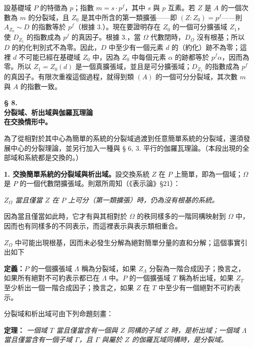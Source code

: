 \documentclass[11pt]{article}
\providecommand{\srcspaced}[1]{#1}
\begin{document}
設基礎域 \(P\) 的特徵為 \(p\)；指數 \(m=s\cdot p^f\)，其中 \(s\) 與 \(p\) 互素。若 \(Z\) 是 \(A\) 的一個次數為 \(m\) 的分裂域，且 \(Z_0\) 是其中所含的第一類擴張——即 \((Z:Z_0)=p^f\)——則 \(A_{Z_0}\sim D\) 的指數等於 \(p^f\)（根據 3.）。現在要證明存在 \(Z_0\) 的一個可分擴張域 \(Z_1\)，使 \(D_{Z_1}\) 的指數成為 \(p^f\) 的真因子。根據 3.，當 \(\Omega\) 代數閉時，\(D_\Omega\) 沒有根基；所以 \(D\) 的約化判別式不為零。因此，\(D\) 中至少有一個元素 \(d\) 的（約化）跡不為零；這裡 \(d\) 不可能已經在基礎域 \(Z_0\) 中，因為 \(Z_0\) 中每個元素 \(\alpha\) 的跡都等於 \(p^f\alpha\)，因而為零。所以 \(Z_1=Z_0(d)\) 是一個真擴張域，並且是可分擴張域；\(D_{Z_1}\) 的指數成為 \(p^f\) 的真因子。有限次重複這個過程，就得到類 \((A)\) 的一個可分分裂域，其次數 \(m\) 與 \(A\) 的指數一致。

\begin{center}
\textbf{§ 8.}\\[0.35em]
\textbf{分裂域、析出域與伽羅瓦理論\\
在交換情形中。}
\end{center}

為了從相對於其中心為簡單的系統的分裂域過渡到任意簡單系統的分裂域，還須發展中心的分裂理論，並另行加入一種與 § 6, 3. 平行的伽羅瓦理論。（本段出現的全部域和系統都是交換的。）

\noindent\textbf{\srcspaced{1. 交換簡單系統的分裂域與析出域。}}\quad 設交換系統 \(Z\) 在 \(P\) 上簡單，即為一個域；\(\Omega\) 是 \(P\) 的一個代數閉擴張域。則眾所周知（《表示論》§21）：

\noindent\emph{\(Z_\Omega\) 當且僅當 \(Z\) 在 \(P\) 上可分（第一類擴張）時，仍為沒有根基的系統。}

因為當且僅當如此時，它才有與其相對於 \(\Omega\) 的秩同樣多的一階同構映射到 \(\Omega\) 中，因而也有同樣多的不同表示，而這裡表示與表示類相重合。

\(Z_\Omega\) 中可能出現根基，因而未必發生分解為絕對簡單分量的直和分解；這個事實引出如下

\noindent\textbf{\srcspaced{定義：}}\quad \(P\) 的一個擴張域 \(\Lambda\) 稱為分裂域，如果 \(Z_\Lambda\) 分裂為一階合成因子；換言之，如果所有絕對不可約表示都已在 \(\Lambda\) 中。\(P\) 的一個擴張域 \(T\) 稱為析出域，如果 \(Z_T\) 至少析出一個一階合成因子；換言之，如果 \(Z\) 在 \(T\) 中至少有一個絕對不可約表示。

分裂域和析出域可由下列命題刻畫：

\noindent\textbf{\srcspaced{定理：}} \emph{一個域 \(T\) 當且僅當含有一個與 \(Z\) 同構的子域 \(Z\) 時，是析出域；一個域 \(\Lambda\) 當且僅當含有一個子域 \(\Gamma\)，且 \(\Gamma\) 與屬於 \(Z\) 的伽羅瓦域同構時，是分裂域。}
\end{document}
